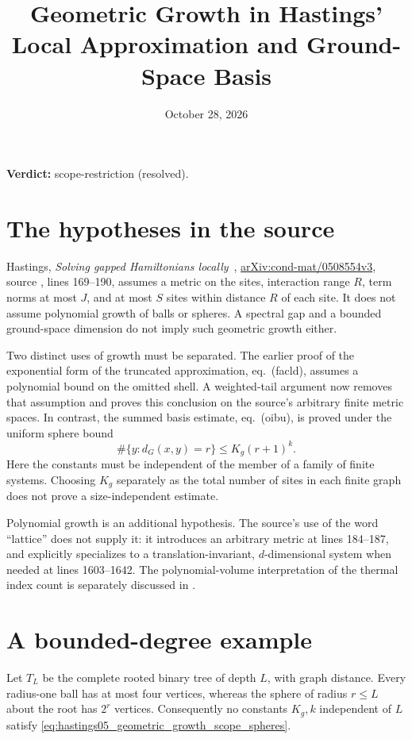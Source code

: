 \documentclass{article}
\title{Geometric Growth in Hastings' Local Approximation and Ground-Space Basis}
\author{}
\date{October 28, 2026}
\providecommand{\gapnote}[2]{\par\noindent\textbf{Verdict:} #1 (#2).\par}
\begin{document}
\maketitle
\gapnote{scope-restriction}{resolved}

\section{The hypotheses in the source}

Hastings, \emph{Solving gapped Hamiltonians locally}~\cite{Hastings2006Solving},
\href{https://arxiv.org/abs/cond-mat/0508554v3}{arXiv:cond-mat/0508554v3},
source , lines 169--190, assumes a metric on the sites,
interaction range $R$, term norms at most $J$, and at most $S$ sites within
distance $R$ of each site. It does not assume polynomial growth of balls or
spheres. A spectral gap and a bounded ground-space dimension do not imply
such geometric growth either.

Two distinct uses of growth must be separated. The earlier proof of the
exponential form of the truncated approximation, eq.~(facld), assumes a
polynomial bound on the omitted shell. A weighted-tail argument now removes
that assumption and proves this conclusion on the source's arbitrary finite
metric spaces. In contrast, the summed basis estimate,
eq.~(oibu), is proved under the uniform sphere bound
\begin{equation}
 \#\{y:d_G(x,y)=r\}\le K_g(r+1)^k.
 \label{eq:hastings05_geometric_growth_scope_spheres}
\end{equation}
Here the constants must be independent of the member of a family of finite
systems. Choosing $K_g$ separately as the total number of sites in each
finite graph does not prove a size-independent estimate.

Polynomial growth is an additional hypothesis. The source's use of the word
``lattice'' does not supply it: it introduces an arbitrary metric at lines 184--187,
and explicitly specializes to a translation-invariant, $d$-dimensional
system when needed at lines 1603--1642. The polynomial-volume interpretation
of the thermal index count is separately discussed in
.

\section{A bounded-degree example}

Let $T_L$ be the complete rooted binary tree of depth $L$, with graph
distance. Every radius-one ball has at most four vertices, whereas the
sphere of radius $r\le L$ about the root has $2^r$ vertices. Consequently
no constants $K_g,k$ independent of $L$ satisfy
\eqref{eq:hastings05_geometric_growth_scope_spheres}.
\end{document}
